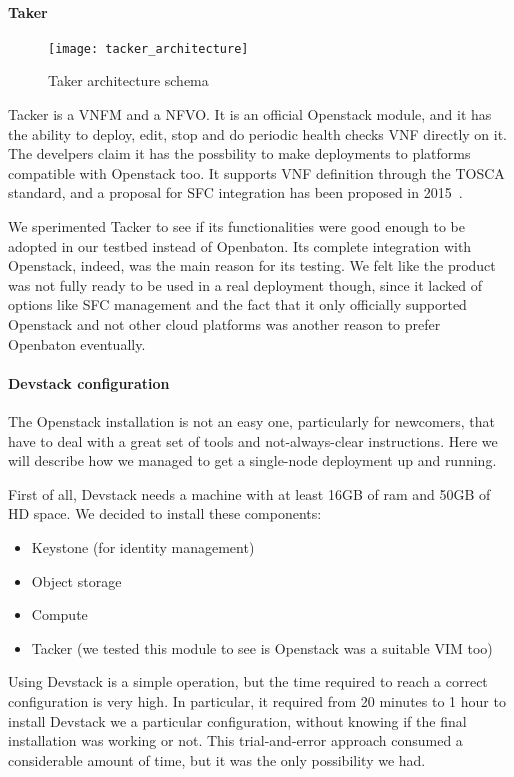 \paragraph*{Taker}
\begin{figure}[t]
  \centering
  \texttt{[image: tacker\_architecture]}
  \caption[Taker architecture schema]{Taker architecture
    schema~\cite{tackerOpenstackwiki}}
\end{figure}
Tacker is a VNFM and a NFVO. It is an official Openstack module, and it has the
ability to deploy, edit, stop and do periodic health checks VNF directly on it.
The develpers claim it has the possbility to make deployments to platforms
compatible with Openstack too. It supports VNF definition through the TOSCA
standard, and a proposal for SFC integration has been proposed in
2015~\cite{tackerOpenstackwiki}.

We sperimented Tacker to see if its functionalities were good enough to be
adopted in our testbed instead of Openbaton. Its complete integration with
Openstack, indeed, was the main reason for its testing. We felt like the product
was not fully ready to be used in a real deployment though, since it lacked of
options like SFC management and the fact that it only officially supported
Openstack and not other cloud platforms was another reason to prefer Openbaton
eventually.

\paragraph*{Devstack configuration}
The Openstack installation is not an easy one, particularly for newcomers, that 
have to deal with a great set of tools and not-always-clear instructions. Here 
we will describe how we managed to get a single-node deployment up and running.

First of all, Devstack needs a machine with at least 16GB of ram and 50GB of HD 
space.
We decided to install these components:
\begin{itemize}
 \item Keystone (for identity management)
 \item Object storage
 \item Compute
 \item Tacker (we tested this module to see is Openstack was a suitable VIM too)
\end{itemize}

Using Devstack is a simple operation, but the time required to reach a correct 
configuration is very high. In particular, it required from 20 minutes to 1 
hour to install Devstack we a particular configuration, without knowing if the 
final installation was working or not. This trial-and-error approach consumed a 
considerable amount of time, but it was the only possibility we had.

